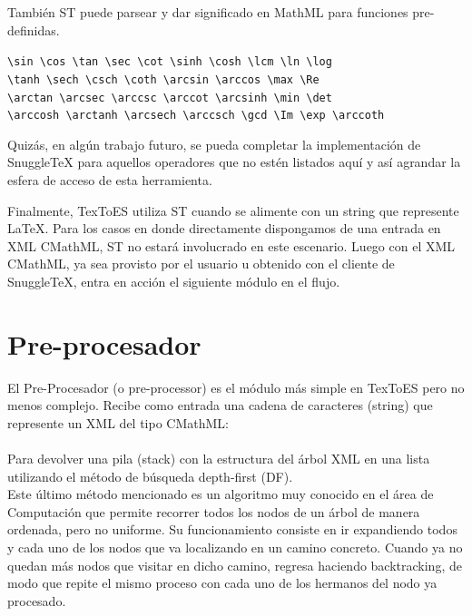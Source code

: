 También ST puede parsear y dar significado en MathML para funciones pre-definidas.

\begin{tcolorbox}
\verb|\sin \cos \tan \sec \cot \sinh \cosh \lcm \ln \log|\\
\verb|\tanh \sech \csch \coth \arcsin \arccos \max \Re| \\
\verb|\arctan \arcsec \arccsc \arccot \arcsinh \min \det|\\
\verb|\arccosh \arctanh \arcsech \arccsch \gcd \Im \exp \arccoth|
\end{tcolorbox}

Quizás, en algún trabajo futuro, se pueda completar la implementación de SnuggleTeX para aquellos operadores que no estén listados aquí y así agrandar la esfera de acceso de esta herramienta.

Finalmente, TexToES utiliza ST cuando se alimente con un string que represente LaTeX. Para los casos en donde directamente dispongamos de una entrada en XML CMathML, ST no estará involucrado en este escenario.
Luego con el XML CMathML, ya sea provisto por el usuario u obtenido con el cliente de SnuggleTeX, entra en acción el siguiente módulo en el flujo.

\section{Pre-procesador}

El Pre-Procesador (o pre-processor) es el módulo más simple en TexToES pero no menos complejo. Recibe como entrada una cadena de caracteres (string) que represente un XML del tipo CMathML:\\[0.01cm]

\\[0.01cm]

Para devolver una pila (stack) con la estructura del árbol XML en una lista utilizando el método de búsqueda depth-first (DF).\\

Este último método mencionado es un algoritmo muy conocido en el área de Computación que permite recorrer todos los nodos de un árbol de manera ordenada, pero no uniforme. Su funcionamiento consiste en ir expandiendo todos y cada uno de los nodos que va localizando en un camino concreto. Cuando ya no quedan más nodos que visitar en dicho camino, regresa haciendo backtracking, de modo que repite el mismo proceso con cada uno de los hermanos del nodo ya procesado.\\

